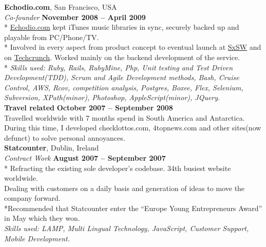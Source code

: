 \documentclass[margin,line]{resume}
\begin{document}
\begin{resume}
    \clearpage 
    \textbf{Echodio.com}, San Francisco, USA \vspace{2mm}\\\vspace{1mm}%
    \textsl{Co-founder} \hfill \textbf{November 2008 -- April 2009}\\*
    \href{http://echodio.com}{Echodio.com} kept iTunes music libraries in sync, securely backed up and playable from PC/Phone/TV. \\* 
    Involved in every aspect from product concept to eventual launch at \href{http://sxsw.com/about/history}{SxSW} and on \href{http://techcrunch.com/2009/03/17/echodio-lets-you-sync-your-itunes-to-the-cloud-300-invites/}{Techcrunch}. Worked mainly on the backend development of the service. \\*   
    \textsl{Skills used: Ruby, Rails, RubyMine, Php, Unit testing and Test Driven Development(TDD), Scrum and Agile Development methods, Bash, Cruise Control, AWS, Rcov, competition analysis, Postgres, Boxee, Flex, Selenium, Subversion, XPath(minor), Photoshop, AppleScript(minor), JQuery. } \vspace{1mm}\\%

    \textbf{Travel related} \hfill \textbf{October 2007 -- September 2008}\vspace{1mm}\\%
    Travelled worldwide with 7 months spend in South America and Antarctica. During this time, I developed checklottos.com, 4topnews.com and other sites(now defunct) to solve personal annoyances. \vspace{1mm}\\%

    \textbf{Statcounter}, Dublin, Ireland \vspace{2mm}\\\vspace{1mm}%
    \textsl{Contract Work} \hfill \textbf{August 2007 -- September 2007}\\*
    Refracting the existing sole developer's codebase. 34th busiest website worldwide. \vspace{1mm}\\%
    Dealing with customers on a daily basis and generation of ideas to move the company forward. \\*Recommended that Statcounter enter the ``Europe Young Entrepreneurs Award'' in May which they won.\vspace{1mm}\\%
    \textsl{Skills used: LAMP, Multi Lingual Technology, JavaScript, Customer Support, Mobile Development.}\vspace{1mm}\\



\end{resume}
\end{document}
